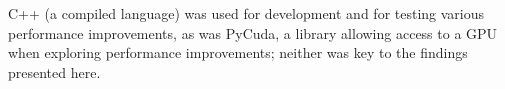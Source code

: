 \documentclass[letterpaper, notitlepage]{report}
\begin{document}
C++ (a compiled language) was used for development and for testing various performance improvements, as was PyCuda, a library allowing access to a GPU when exploring performance improvements; neither was key to the findings presented here.

%
%
\end{document}
